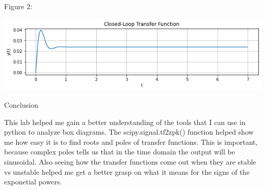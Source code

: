 \documentclass[nobib]{MSword}
\begin{document}
Figure 2:

\includegraphics[scale = 0.75]
{txt/Lab7Fig2.png}

\begin{center}
    Conclusion
\end{center}
    This lab helped me gain a better understanding of the tools that I can use in python to analyze box diagrams. The scipy.signal.tf2zpk() function helped show me how easy it is to find roots and poles of transfer functions. This is important, because complex poles tells us that in the time domain the output will be sinusoidal. Also seeing how the transfer functions come out when they are stable vs unstable helped me get a better grasp on what it means for the signs of the exponetial powers.
\end{document}
